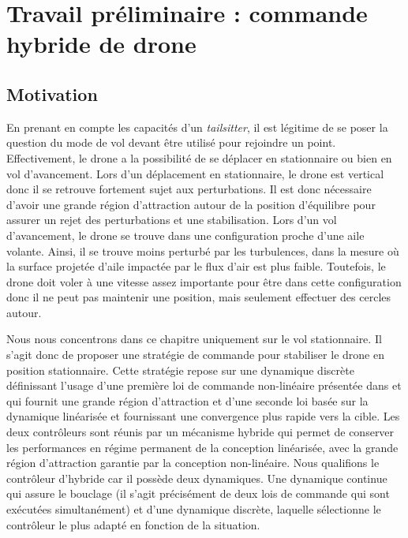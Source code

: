 \chapter{Travail préliminaire : commande hybride de drone}
\label{chap:hybrid}
\minitoc




\section{Motivation}
En prenant en compte les capacités d'un \textit{tailsitter}, il est légitime de se poser la question du mode de vol devant être utilisé pour rejoindre un point. Effectivement, le drone a la possibilité de se déplacer en stationnaire ou bien en vol d'avancement. Lors d'un déplacement en stationnaire, le drone est vertical donc il se retrouve fortement sujet aux perturbations. Il est donc nécessaire d'avoir une grande région d'attraction autour de la position d'équilibre pour assurer un rejet des perturbations et une stabilisation. Lors d'un vol d'avancement, le drone se trouve dans une configuration proche d'une aile volante. Ainsi, il se trouve moins perturbé par les turbulences, dans la mesure où la surface projetée d'aile impactée par le flux d'air est plus faible. Toutefois, le drone doit voler à une vitesse assez importante pour être dans cette configuration donc il ne peut pas maintenir une position, mais seulement effectuer des cercles autour. 

Nous nous concentrons dans ce chapitre uniquement sur le vol stationnaire. Il s'agit donc de proposer une stratégie de commande pour stabiliser le drone en position stationnaire. Cette stratégie repose sur une dynamique discrète définissant l'usage d'une première loi de commande non-linéaire présentée dans \cite{2020e-MicCenZacFra} et qui fournit une grande région d'attraction et d'une seconde loi basée sur la dynamique linéarisée et fournissant une convergence plus rapide vers la cible. Les deux contrôleurs sont réunis par un mécanisme hybride qui permet de conserver les performances en régime permanent de la conception linéarisée, avec la grande région d'attraction garantie par la conception non-linéaire.
{ \color{blue}
  Nous qualifions le contrôleur d'hybride car il possède deux dynamiques. Une dynamique continue qui assure le bouclage (il s'agit précisément de deux lois de commande qui sont exécutées simultanément) et d'une dynamique discrète, laquelle sélectionne le contrôleur le plus adapté en fonction de la situation.
}

